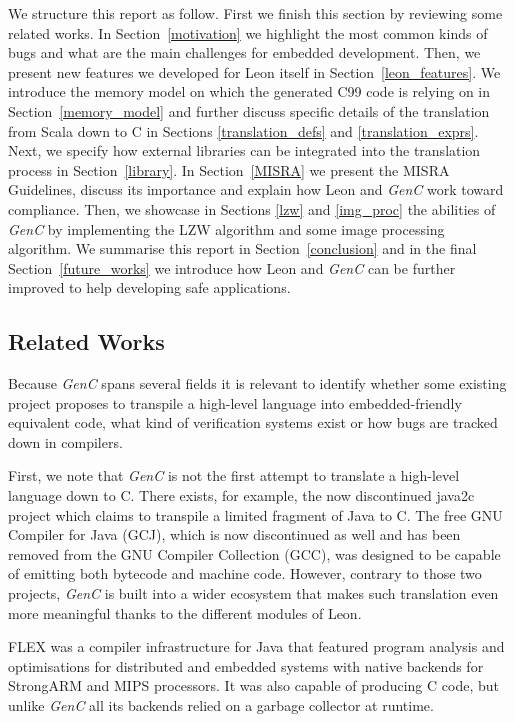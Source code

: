 \documentclass[a4paper,twoside]{article}
\newcommand{\GenC}{\emph{GenC}\xspace}
\newcommand{\RefSec}[1]{Section~\ref{#1}}
\begin{document}
We structure this report as follow. First we finish this section by reviewing
some related works. In \RefSec{motivation} we highlight the most common kinds of
bugs and what are the main challenges for embedded development. Then, we present
new features we developed for Leon itself in \RefSec{leon_features}. We
introduce the memory model on which the generated C99 code is relying on in
\RefSec{memory_model} and further discuss specific details of the translation
from Scala down to C in Sections \ref{translation_defs} and
\ref{translation_exprs}. Next, we specify how external libraries can be
integrated into the translation process in \RefSec{library}. In \RefSec{MISRA}
we present the MISRA Guidelines, discuss its importance and explain how Leon and
\GenC work toward compliance. Then, we showcase in Sections \ref{lzw} and
\ref{img_proc} the abilities of \GenC by implementing the LZW algorithm and some
image processing algorithm. We summarise this report in \RefSec{conclusion} and
in the final \RefSec{future_works} we introduce how Leon and \GenC can be
further improved to help developing safe applications.

\subsection*{Related Works}

Because \GenC spans several fields it is relevant to identify whether some
existing project proposes to transpile a high-level language into
embedded-friendly equivalent code, what kind of verification systems exist or
how bugs are tracked down in compilers.

First, we note that \GenC is not the first attempt to translate a high-level
language down to C. There exists, for example, the now discontinued java2c
\cite{java2c} project which claims to transpile a limited fragment of Java to C.
The free GNU Compiler for Java (GCJ), which is now discontinued as well and has
been removed from the GNU Compiler Collection (GCC), was designed to be capable
of emitting both bytecode and machine code. However, contrary to those two
projects, \GenC is built into a wider ecosystem that makes such translation even
more meaningful thanks to the different modules of Leon.

FLEX \cite{flex} was a compiler infrastructure for Java that featured program
analysis and optimisations for distributed and embedded systems with native
backends for StrongARM and MIPS processors. It was also capable of producing C
code, but unlike \GenC all its backends relied on a garbage collector at
runtime.
\end{document}
